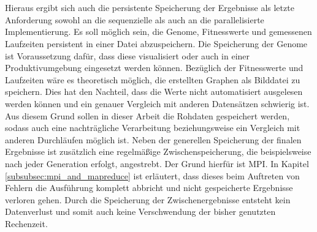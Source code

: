 \\\\
Hieraus ergibt sich auch die persistente Speicherung der Ergebnisse als letzte Anforderung sowohl an die sequenzielle als auch an die parallelisierte Implementierung. Es soll möglich sein, die Genome, Fitnesswerte und gemessenen Laufzeiten persistent in einer Datei abzuspeichern. Die Speicherung der Genome ist Voraussetzung dafür, dass diese visualisiert oder auch in einer Produktivumgebung eingesetzt werden können. Bezüglich der Fitnesswerte und Laufzeiten wäre es theoretisch möglich, die erstellten Graphen als Bilddatei zu speichern. Dies hat den Nachteil, dass die Werte nicht automatisiert ausgelesen werden können und ein genauer Vergleich mit anderen Datensätzen schwierig ist. Aus diesem Grund sollen in dieser Arbeit die Rohdaten gespeichert werden, sodass auch eine nachträgliche Verarbeitung beziehungsweise ein Vergleich mit anderen Durchläufen möglich ist. Neben der generellen Speicherung der finalen Ergebnisse ist zusätzlich eine regelmäßige Zwischenspeicherung, die beispielsweise nach jeder Generation erfolgt, angestrebt. Der Grund hierfür ist \ac{MPI}. In Kapitel \ref{subsubsec:mpi_and_mapreduce} ist erläutert, dass dieses beim Auftreten von Fehlern die Ausführung komplett abbricht und nicht gespeicherte Ergebnisse verloren gehen. Durch die Speicherung der Zwischenergebnisse entsteht kein Datenverlust und somit auch keine Verschwendung der bisher genutzten Rechenzeit.


